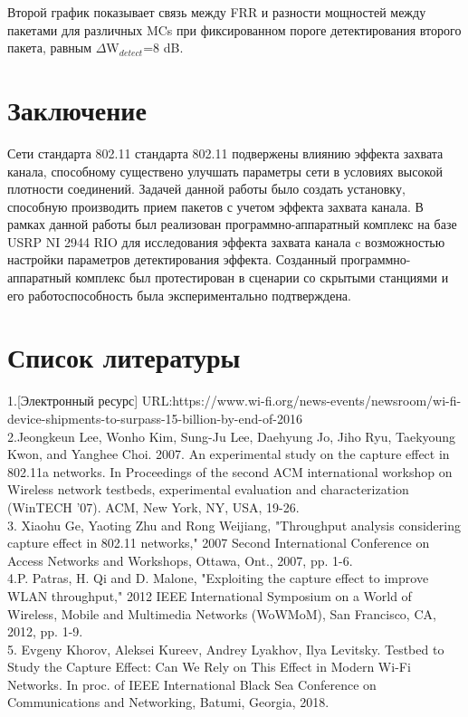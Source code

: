 \documentclass{llncs}
\begin{document}
Второй график показывает связь между FRR и разности мощностей между пакетами для различных MCs при фиксированном пороге детектирования второго пакета, равным $\Delta$W$_{detect}$=8 dB. 
\\
\section{Заключение}
Сети стандарта 802.11 стандарта 802.11 подвержены влиянию эффекта захвата канала, способному существено улучшать параметры сети в условиях высокой плотности соединений.
Задачей данной работы было создать установку, способную производить прием пакетов  с учетом эффекта захвата канала.
В рамках данной работы был реализован программно-аппаратный комплекс на базе USRP NI 2944 RIO для исследования эффекта захвата канала c возможностью настройки параметров  детектирования эффекта. Созданный программно-аппаратный комплекс был протестирован в сценарии со скрытыми станциями и его работоспособность была экспериментально подтверждена. 
 
\section{Список литературы}
%
1.[Электронный ресурс] URL:https://www.wi-fi.org/news-events/newsroom/wi-fi-device-shipments-to-surpass-15-billion-by-end-of-2016
\\
2.Jeongkeun Lee, Wonho Kim, Sung-Ju Lee, Daehyung Jo, Jiho Ryu, Taekyoung Kwon, and Yanghee Choi. 2007. An experimental study on the capture effect in 802.11a networks. In Proceedings of the second ACM international workshop on Wireless network testbeds, experimental evaluation and characterization (WinTECH '07). ACM, New York, NY, USA, 19-26.
\\
3. Xiaohu Ge, Yaoting Zhu and Rong Weijiang, "Throughput analysis considering capture effect in 802.11 networks," 2007 Second International Conference on Access Networks and Workshops, Ottawa, Ont., 2007, pp. 1-6.
\\
4.P. Patras, H. Qi and D. Malone, "Exploiting the capture effect to improve WLAN throughput," 2012 IEEE International Symposium on a World of Wireless, Mobile and Multimedia Networks (WoWMoM), San Francisco, CA, 2012, pp. 1-9.
\\
5. Evgeny Khorov, Aleksei Kureev, Andrey Lyakhov, Ilya Levitsky. Testbed to Study the Capture Effect: Can We Rely on This Effect in Modern Wi-Fi Networks. In proc. of IEEE International Black Sea Conference on Communications and Networking, Batumi, Georgia, 2018.
\\





%
\end{document}
